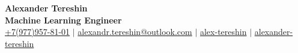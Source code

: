 \documentclass[letterpaper,11pt]{article}
\begin{document}
\begin{center}
    \textbf{\Huge Alexander Tereshin} \\ \vspace{5pt}
    \textbf{\Large Machine Learning Engineer} \\ \vspace{5pt}
    \small
    \faMobile \hspace{.5pt} \href{tel:+7(977)957-81-01}{+7(977)957-81-01}
    $|$
    \faAt \hspace{.5pt} \href{mailto:alexandr.tereshin@outlook.com}{alexandr.tereshin@outlook.com}
    $|$
    \faLinkedinSquare \hspace{.5pt} \href{https://www.linkedin.com/in/alex-tereshin}{alex-tereshin}
    $|$
    \faGithub \hspace{.5pt} \href{https://github.com/alexander-tereshin}{alexander-tereshin}
\end{center}
\vspace{-15pt}

\end{document}
